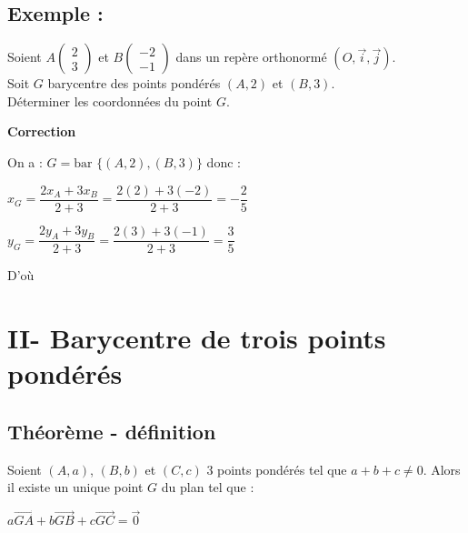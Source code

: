 \documentclass{article}
\begin{document}
\subsection*{Exemple :}

\noindent Soient $A \begin{pmatrix} 2 \\ 3 \end{pmatrix}$ et $B \begin{pmatrix} -2 \\ -1 \end{pmatrix}$ dans un repère orthonormé $(O, \vec{i}, \vec{j})$. \\
Soit $G$ barycentre des points pondérés $(A, 2)$ et $(B, 3)$. \\
Déterminer les coordonnées du point $G$.

\vspace{2em}

\begin{center}
    \textbf{Correction}
\end{center}

\noindent On a : $G = \text{bar } \{(A, 2), (B, 3)\}$ donc :

\vspace{1.5em}

\noindent $x_G = \dfrac{2 x_A + 3 x_B}{2 + 3} = \dfrac{2(2) + 3(-2)}{2 + 3} = -\dfrac{2}{5}$

\vspace{2em}

\noindent $y_G = \dfrac{2 y_A + 3 y_B}{2 + 3} = \dfrac{2(3) + 3(-1)}{2 + 3} = \dfrac{3}{5}$

\vspace{2em}

\noindent D'où 

\section*{II- Barycentre de trois points pondérés}

\subsection*{Théorème - définition}

\noindent Soient $(A, a)$, $(B, b)$ et $(C, c)$ 3 points pondérés tel que $a + b + c \neq 0$. Alors il existe un unique point $G$ du plan tel que :
\begin{center}
    $a \overrightarrow{GA} + b \overrightarrow{GB} + c \overrightarrow{GC} = \vec{0}$
\end{center}
\end{document}
